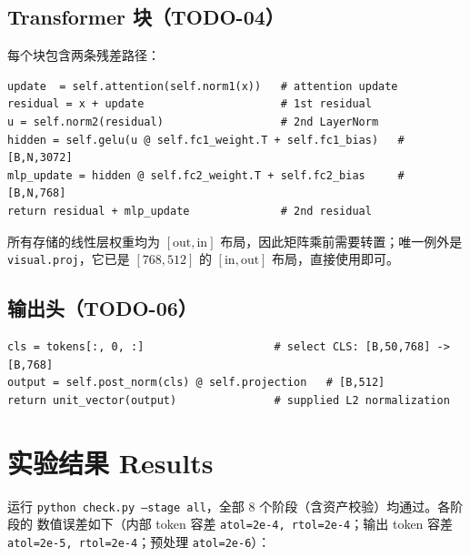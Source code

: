 \documentclass[a4paper,12pt]{article}
\begin{document}
\subsection{Transformer 块（TODO-04）}

每个块包含两条残差路径：

\begin{lstlisting}
update  = self.attention(self.norm1(x))   # attention update
residual = x + update                     # 1st residual
u = self.norm2(residual)                  # 2nd LayerNorm
hidden = self.gelu(u @ self.fc1_weight.T + self.fc1_bias)   # [B,N,3072]
mlp_update = hidden @ self.fc2_weight.T + self.fc2_bias     # [B,N,768]
return residual + mlp_update              # 2nd residual
\end{lstlisting}

所有存储的线性层权重均为 $[\text{out},\text{in}]$ 布局，因此矩阵乘前需要转置；唯一例外是
\texttt{visual.proj}，它已是 $[768,512]$ 的 $[\text{in},\text{out}]$ 布局，直接使用即可。

\subsection{输出头（TODO-06）}

\begin{lstlisting}
cls = tokens[:, 0, :]                    # select CLS: [B,50,768] -> [B,768]
output = self.post_norm(cls) @ self.projection   # [B,512]
return unit_vector(output)               # supplied L2 normalization
\end{lstlisting}

\section{实验结果 Results}

运行 \texttt{python check.py --stage all}，全部 8 个阶段（含资产校验）均通过。各阶段的
数值误差如下（内部 token 容差 \texttt{atol=2e-4, rtol=2e-4}；输出 token 容差
\texttt{atol=2e-5, rtol=2e-4}；预处理 \texttt{atol=2e-6}）：
\end{document}
